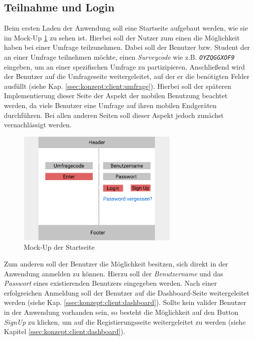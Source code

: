 \subsection{Teilnahme und Login}

Beim ersten Laden der Anwendung soll eine Startseite aufgebaut werden, wie sie im Mock-Up \ref{fig:MockSignin} zu sehen ist. 
Hierbei soll der Nutzer zum einen die Möglichkeit haben bei einer Umfrage teilzunehmen. 
Dabei soll der Benutzer bzw. Student der an einer Umfrage teilnehmen möchte, einen \emph{Surveycode} wie z.B. \emph{\texttt{OYZQGGXOF9}} eingeben, um an einer spezifischen Umfrage zu partizipieren. 
Anschließend wird der Benutzer auf die Umfrageseite weitergeleitet, auf der er die benötigten Felder ausfüllt (siehe Kap. \ref{ssec:konzept:client:umfrage}).
Hierbei soll der späteren Implementierung dieser Seite der Aspekt der mobilen Benutzung beachtet werden, da viele Benutzer eine Umfrage auf ihren mobilen Endgeräten durchführen. 
Bei allen anderen Seiten soll dieser Aspekt jedoch zunächst vernachlässigt werden.

\begin{figure}[h]
	\centering
	\includegraphics[width=0.7\textwidth]{img/konzeption/client/signin}
	\captionsetup{justification=centering, format=plain}
	\caption[Mock-Up der Startseite]{Mock-Up der Startseite \\\figma}
	\label{fig:MockSignin}
\end{figure}

Zum anderen soll der Benutzer die Möglichkeit besitzen, sich direkt in der Anwendung anmelden zu können.
Hierzu soll der \emph{Benutzername} und das \emph{Passwort} eines existierenden Benutzers eingegeben werden. 
Nach einer erfolgreichen Anmeldung soll der Benutzer auf die Dashboard-Seite weitergeleitet werden (siehe Kap. \ref{ssec:konzept:client:dashboard}).
Sollte kein valider Benutzer in der Anwendung vorhanden sein, so besteht die Möglichkeit auf den Button \emph{SignUp} zu klicken, um auf die Registierungsseite weitergeleitet zu werden (siehe Kapitel \ref{ssec:konzept:client:dashboard}).

